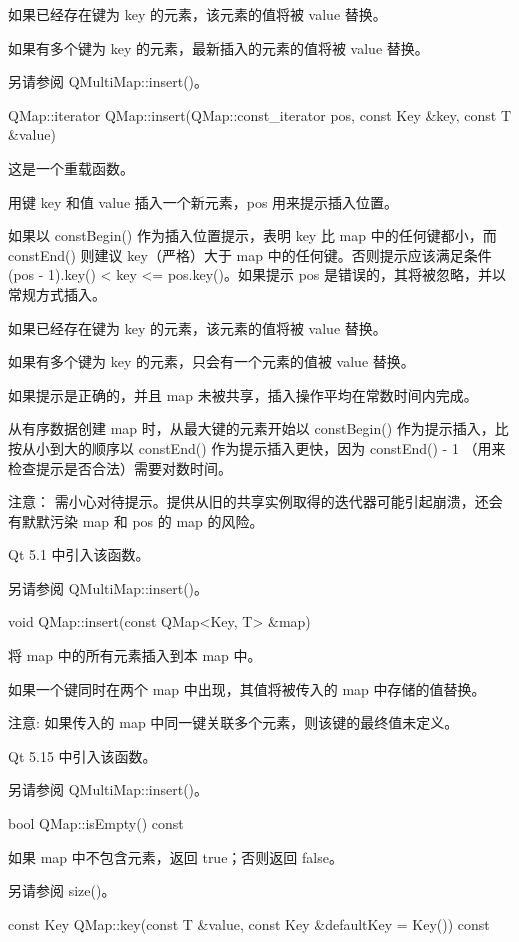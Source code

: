 如果已经存在键为 key 的元素，该元素的值将被 value 替换。

如果有多个键为 key 的元素，最新插入的元素的值将被 value 替换。

另请参阅 QMultiMap::insert()。

\splitLine

QMap::iterator QMap::insert(QMap::const\_iterator pos, const Key \&key, const T \&value)

这是一个重载函数。

用键 key 和值 value 插入一个新元素，pos 用来提示插入位置。

如果以 constBegin() 作为插入位置提示，表明 key 比 map 中的任何键都小，而 constEnd() 则建议 key（严格）大于 map 中的任何键。否则提示应该满足条件 (pos - 1).key() < key <= pos.key()。如果提示 pos 是错误的，其将被忽略，并以常规方式插入。

如果已经存在键为 key 的元素，该元素的值将被 value 替换。

如果有多个键为 key 的元素，只会有一个元素的值被 value 替换。

如果提示是正确的，并且 map 未被共享，插入操作平均在常数时间内完成。

从有序数据创建 map 时，从最大键的元素开始以 constBegin() 作为提示插入，比按从小到大的顺序以 constEnd() 作为提示插入更快，因为 constEnd() - 1 （用来检查提示是否合法）需要对数时间。

注意： 需小心对待提示。提供从旧的共享实例取得的迭代器可能引起崩溃，还会有默默污染 map 和 pos 的 map 的风险。

Qt 5.1 中引入该函数。

另请参阅 QMultiMap::insert()。

\splitLine

void QMap::insert(const QMap<Key, T> \&map)

将 map 中的所有元素插入到本 map 中。

如果一个键同时在两个 map 中出现，其值将被传入的 map 中存储的值替换。

注意: 如果传入的 map 中同一键关联多个元素，则该键的最终值未定义。

Qt 5.15 中引入该函数。

另请参阅 QMultiMap::insert()。

\splitLine

bool QMap::isEmpty() const

如果 map 中不包含元素，返回 true；否则返回 false。

另请参阅 size()。

\splitLine

const Key QMap::key(const T \&value, const Key \&defaultKey = Key()) const

